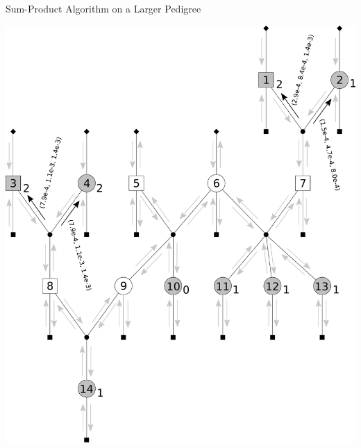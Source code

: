 \documentclass[letter,graphicx]{beamer}
\begin{document}
\begin{frame}{Sum-Product Algorithm on a Larger Pedigree} 
\begin{center} 
\includegraphics[height = 0.8\textheight]{./images/mg-example-step11.pdf} 
\end{center}
\end{frame}
\end{document}
